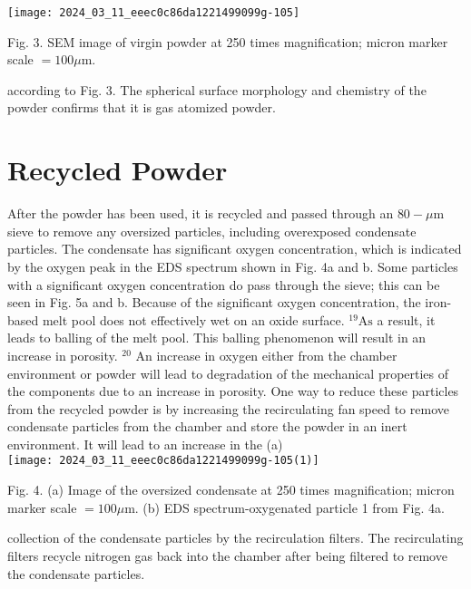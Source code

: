 \documentclass[10pt]{article}
\begin{document}
\begin{center}
\texttt{[image: 2024\_03\_11\_eeec0c86da1221499099g-105]}
\end{center}

Fig. 3. SEM image of virgin powder at 250 times magnification; micron marker scale $=100 \mu \mathrm{m}$.

according to Fig. 3. The spherical surface morphology and chemistry of the powder confirms that it is gas atomized powder.

\section*{Recycled Powder}
After the powder has been used, it is recycled and passed through an $80-\mu \mathrm{m}$ sieve to remove any oversized particles, including overexposed condensate particles. The condensate has significant oxygen concentration, which is indicated by the oxygen peak in the EDS spectrum shown in Fig. 4a and b. Some particles with a significant oxygen concentration do pass through the sieve; this can be seen in Fig. 5a and b. Because of the significant oxygen concentration, the iron-based melt pool does not effectively wet on an oxide surface. ${ }^{19} \mathrm{As}$ a result, it leads to balling of the melt pool. This balling phenomenon will result in an increase in porosity. ${ }^{20}$ An increase in oxygen either from the chamber environment or powder will lead to degradation of the mechanical properties of the components due to an increase in porosity. One way to reduce these particles from the recycled powder is by increasing the recirculating fan speed to remove condensate particles from the chamber and store the powder in an inert environment. It will lead to an increase in the (a)\\
\texttt{[image: 2024\_03\_11\_eeec0c86da1221499099g-105(1)]}

Fig. 4. (a) Image of the oversized condensate at 250 times magnification; micron marker scale $=100 \mu \mathrm{m}$. (b) EDS spectrum-oxygenated particle 1 from Fig. 4a.

collection of the condensate particles by the recirculation filters. The recirculating filters recycle nitrogen gas back into the chamber after being filtered to remove the condensate particles.
\end{document}
